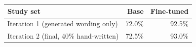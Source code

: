 \begin{tabular}{lrr}
\toprule
Study set & Base & Fine-tuned \\
\midrule
Iteration 1 (generated wording only) & 72.0\% & 92.5\% \\
Iteration 2 (final, 40\% hand-written) & 72.5\% & 93.0\% \\
\bottomrule
\end{tabular}
